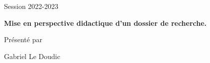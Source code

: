 \documentclass[french, 10pt]{article}
\begin{document}


\begin{center}
\LARGE{}\medskip

 \LARGE{}\medskip

\large{Session 2022-2023}\bigskip

\textbf{\LARGE{\textcolor{cobalt}{Mise en perspective didactique d'un dossier de recherche.}}}\bigskip

Présenté par \vspace{.5cm}

  \Large{Gabriel Le Doudic}\bigskip
\end{center}

\end{document}
